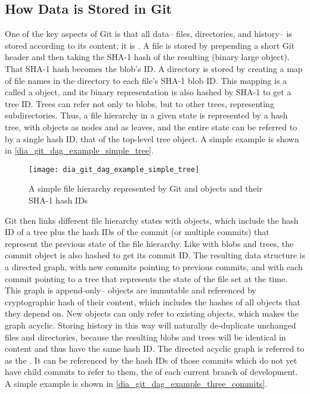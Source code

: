 %


\subsection{How Data is Stored in Git}

One of the key aspects of Git is that all data-- files, directories, and
history-- is stored according to its content; it is . A file is stored by
prepending a short Git header and then taking the SHA-1 hash of the resulting
 (binary large object). That SHA-1 hash becomes the blob's ID. A
directory is stored by creating a map of file names in the directory to each
file's SHA-1 blob ID. This mapping is a called a  object, and its
binary representation is also hashed by SHA-1 to get a tree ID. Trees can refer
not only to blobs, but to other trees, representing subdirectories. Thus, a file
hierarchy in a given state is represented by a hash tree, with 
objects as nodes and  as leaves, and the entire state can be
referred to by a single hash ID, that of the top-level tree object. A simple
example is shown in \autoref{dia_git_dag_example_simple_tree}.

\begin{figure}[h]
    \centering
    \texttt{[image: dia\_git\_dag\_example\_simple\_tree]}
    \caption{A simple file hierarchy represented by Git  and
         objects and their SHA-1 hash IDs}
    \label{dia_git_dag_example_simple_tree}
\end{figure}

Git then links different file hierarchy states with  objects,
which include the hash ID of a tree plus the hash IDs of the commit (or multiple
commits) that represent the previous state of the file hierarchy. Like with
blobs and trees, the commit object is also hashed to get its commit ID. The
resulting data structure is a directed graph, with new commits pointing to
previous commits, and with each commit pointing to a tree that represents the
state of the file set at the time. This graph is append-only-- objects are
immutable and referenced by cryptographic hash of their content, which includes
the hashes of all objects that they depend on. New objects can only refer to
existing objects, which makes the graph acyclic. Storing history in this way
will naturally de-duplicate unchanged files and directories, because the
resulting blobs and trees will be identical in content and thus have the same
hash ID. The directed acyclic graph is referred to as the . It can
be referenced by the hash IDs of those commits which do not yet have child
commits to refer to them, the  of each current branch of
development. A simple example is shown in
\autoref{dia_git_dag_example_three_commits}.

